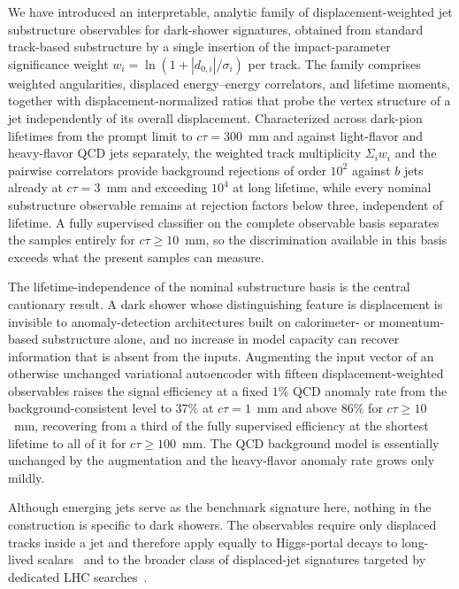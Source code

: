 \documentclass[a4paper,11pt]{article}
\newcommand{\ctau}{c\tau}
\begin{document}
We have introduced an interpretable, analytic family of
displacement-weighted jet substructure observables for dark-shower
signatures, obtained from standard track-based substructure by a single
insertion of the impact-parameter significance weight
$w_i = \ln(1 + |d_{0,i}|/\sigma_i)$ per track. The family comprises
weighted angularities, displaced energy--energy correlators, and
lifetime moments, together with displacement-normalized ratios that
probe the vertex structure of a jet independently of its overall
displacement. Characterized across dark-pion lifetimes from the prompt
limit to $\ctau = 300$~mm and against light-flavor and heavy-flavor
QCD jets separately, the weighted track multiplicity $\Sigma_i w_i$
and the pairwise correlators provide background rejections of order
$10^2$ against $b$ jets already at $\ctau = 3$~mm and exceeding
$10^4$ at long lifetime, while every nominal substructure observable
remains at rejection factors below three, independent of lifetime. A
fully supervised classifier on the complete observable basis separates
the samples entirely for $\ctau \geq 10$~mm, so the discrimination
available in this basis exceeds what the present samples can measure.

The lifetime-independence of the nominal substructure basis is the
central cautionary result. A dark shower whose distinguishing feature
is displacement is invisible to anomaly-detection architectures built
on calorimeter- or momentum-based substructure alone, and no increase
in model capacity can recover information that is absent from the
inputs. Augmenting the input vector of an otherwise unchanged
variational autoencoder with fifteen displacement-weighted observables
raises the signal efficiency at a fixed $1\%$ QCD anomaly rate from
the background-consistent level to $37\%$ at $\ctau = 1$~mm and above
$86\%$ for $\ctau \geq 10$~mm, recovering from a third of the fully
supervised efficiency at the shortest lifetime to all of it for
$\ctau \geq 100$~mm. The QCD background
model is essentially unchanged by the augmentation and the heavy-flavor
anomaly rate grows only mildly.

Although emerging jets serve as the benchmark signature here, nothing
in the construction is specific to dark showers. The observables
require only displaced tracks inside a jet and therefore apply equally
to Higgs-portal decays to long-lived
scalars~\cite{Strassler:2006ri,Curtin:2013fra} and to the broader
class of displaced-jet signatures targeted by dedicated LHC
searches~\cite{ATLAS:LLPID,CMS:LLPjets}.
\end{document}
